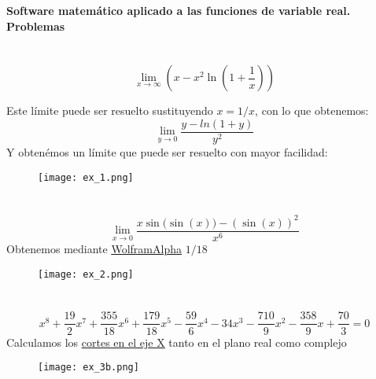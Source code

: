 \documentclass[12pt,a4paper,oneside,onecolumn]{article}
\begin{document}
 
	
	\begin{center}
		$\mbox{}$\\[2.0cm]
		\LARGE{\textbf{Software matem\'atico aplicado a las funciones de variable real. Problemas}}\\[2.0cm]
		
	\end{center}	
	
	\section{}
	
	\[
	\lim_{x \to \infty}(x -x^2\ln(1 + \frac{1}{x}))
	\]
	
	Este l\'imite puede ser resuelto sustituyendo \(x=1/x\), con lo que obtenemos: \[
	\lim_{y \to 0}\frac{y-ln(1+y)}{y^2}
	\]
	Y obten\'emos un l\'imite que puede ser resuelto con mayor facilidad:
	
	\vspace{0.3cm}
	\begin{figure}[!h]
		\centering
		\texttt{[image: ex\_1.png]}
		\caption{}
		\label{fig:01}
	\end{figure}
	
	\section{}
	\[
	\lim_{x \to 0}\frac{x\sin{(\sin{(x)}})-(\sin(x))^2}{x^6}
	\]
	Obtenemos mediante \href{https://www.wolframalpha.com/input/?i=lim+x-%3E0+%28%28x*sen%28sen%28x%29%29+-+sen%5E2%28x%29%29%2F%28x%5E6%29%29}{\underline{WolframAlpha}} \(1/18\)
	\begin{figure}[!h]
		\centering
		\texttt{[image: ex\_2.png]}
		\caption{}
		\label{fig:02}
	\end{figure}

	\section{}
	\[
	x^8+\frac{19}{2}x^7+\frac{355}{18}x^6+\frac{179}{18}x^5-\frac{59}{6}x^4-34x^3-\frac{710}{9}x^2-\frac{358}{9}x +\frac{70}{3} = 0
	\]
	Calculamos los \href{https://www.wolframalpha.com/input/?i=x%5E%288%29%2B%28%2819%29%2F%282%29%29+x%5E%287%29%2B%28%28355%29%2F%2818%29%29+x%5E%286%29%2B%28%28179%29%2F%2818%29%29+x%5E%285%29-%28%2859%29%2F%286%29%29+x%5E%284%29-34+x%5E%283%29-%28%28710%29%2F%289%29%29+x%5E%282%29-%28%28358%29%2F%289%29%29+x%2B%28%2870%29%2F%283%29%29}{\underline{cortes en el eje X}} tanto en el plano real como complejo
	\begin{figure}[!h]
		\centering
		\texttt{[image: ex\_3b.png]}
		\caption{}
		\label{fig:03}
	\end{figure}
\end{document}
